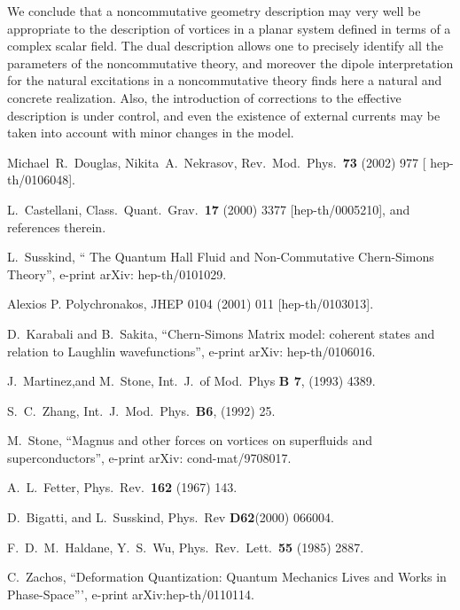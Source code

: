 \documentclass[a4paper,12pt]{article} \tolerance=200
\begin{document}
 We conclude that a noncommutative geometry description may very well
 be appropriate to the description of vortices in a planar system
 defined in terms of a complex scalar field. The dual description allows one
 to precisely identify all the parameters of the noncommutative
 theory, and moreover the dipole interpretation for the natural
 excitations in a noncommutative theory finds here a natural and
 concrete realization. Also, the introduction of corrections to the
 effective description is under control, and even the existence of
 external currents may be taken into account with minor changes in the
 model.

\begin{thebibliography}{99}
 Michael~R.~Douglas, Nikita~A.~Nekrasov,
  Rev.~Mod.~Phys.~{\bf 73} (2002) 977 [ hep-th/0106048].
  
 L.~Castellani, Class.~Quant.~Grav.~{\bf 17}
  (2000) 3377 [hep-th/0005210], and references therein.
  
L.~Susskind, `` The Quantum Hall Fluid and
  Non-Commutative Chern-Simons Theory'', e-print arXiv:
  hep-th/0101029.
  
 Alexios P. Polychronakos, JHEP 0104 (2001) 011
  [hep-th/0103013].
  
D.~Karabali and B.~Sakita, ``Chern-Simons Matrix model:
  coherent states and relation to Laughlin wavefunctions'', e-print
  arXiv: hep-th/0106016.
  
J.~Martinez,and M.~Stone, Int.~J.~of Mod.~Phys {\bf B
    7}, (1993) 4389.
  
 S.~C.~Zhang, Int.~J.~Mod.~Phys.~{\bf B6}, (1992) 25.
  
 M.~Stone, ``Magnus and other forces on vortices on
  superfluids and superconductors'', e-print arXiv: cond-mat/9708017.
  
 A.~L.~Fetter, Phys.~Rev.~{\bf 162} (1967) 143.
 
 D.~Bigatti, and L.~Susskind, Phys.~Rev {\bf D62}(2000)
  066004.
  
F.~D.~M.~Haldane, Y.~S.~Wu, Phys.~Rev.~Lett.~{\bf 55}
  (1985) 2887.
  
C.~Zachos, ``Deformation Quantization: Quantum
  Mechanics Lives and Works in Phase-Space''', e-print
  arXiv:hep-th/0110114.
\end{thebibliography}
\end{document}
